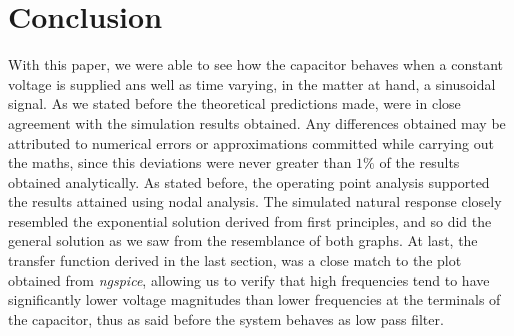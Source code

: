 \section{Conclusion}
\label{sec:conclusion}

With this paper, we were able to see how the capacitor behaves when a constant voltage is supplied ans well as time varying, in the matter at hand, a sinusoidal signal. As we stated before the theoretical predictions made, were in close agreement with the simulation results obtained. Any differences obtained may be attributed to numerical errors or approximations committed while carrying out the maths, since this deviations were never greater than $1\%$ of the results obtained analytically. 
As stated before, the operating point analysis supported the results attained using nodal analysis. The simulated natural response closely resembled the exponential solution derived from first principles, and so did the general solution as we saw from the resemblance of both graphs. At last, the transfer function derived in the last section, was a close match to the plot obtained from \textit{ngspice}, allowing us to verify that high frequencies tend to have significantly lower voltage magnitudes than lower frequencies at the terminals of the capacitor, thus as said before the system behaves as low pass filter.
